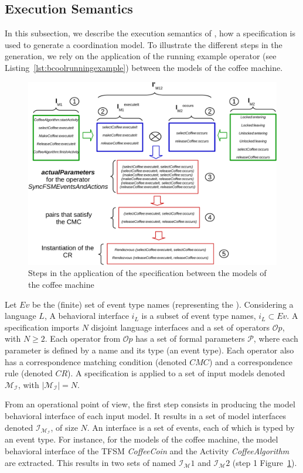 \subsection{Execution Semantics}
In this subsection, we describe the execution semantics of \bcool, \ie how a \bcool specification is used to generate a coordination model. To illustrate the different steps in the generation, we rely on the application of the running example operator (see Listing~\ref{lst:bcoolrunningexample}) between the models of the coffee machine.

\begin{figure} [h]
	\center
	\includegraphics[width=.9\textwidth]{bcool/figs/semantics}
	\caption{Steps in the application of the \bcool specification between the models of the coffee machine}
	\label{fig:semantics}
\end{figure}

Let $Ev$ be the (finite) set of event type names (representing the \dse). Considering a language $L$, A behavioral interface $i_L$ is a subset of event type names, $i_L \subset Ev$. A \bcool specification imports $N$ disjoint language interfaces and a set of operators $\mathcal{O}p$, with $N\geq 2$. Each operator from $\mathcal{O}p$ has a set of formal parameters $\mathcal{P}$, where each parameter is defined by a name and its type (\ie an event type). Each operator also has a correspondence matching condition (denoted $CMC$) and a correspondence rule (denoted $CR$). A \bcool specification is applied to a set of input models denoted $\mathcal{M_I}$, with $|\mathcal{M_I}| = N$.

From an operational point of view, the first step consists in producing the model behavioral interface of each input model. It results in a set of model interfaces denoted $\mathcal{I_{M_I}}$, of size $N$. An interface is a set of events, each of which is typed by an event type. For instance, for the models of the coffee machine, the model behavioral interface of the TFSM \emph{CoffeeCoin} and the Activity \emph{CoffeeAlgorithm} are extracted. This results in two sets of \mse named  $\mathcal{I_M}{1}$ and $\mathcal{I_M}{2}$ (step 1 Figure~\ref{fig:semantics}).

